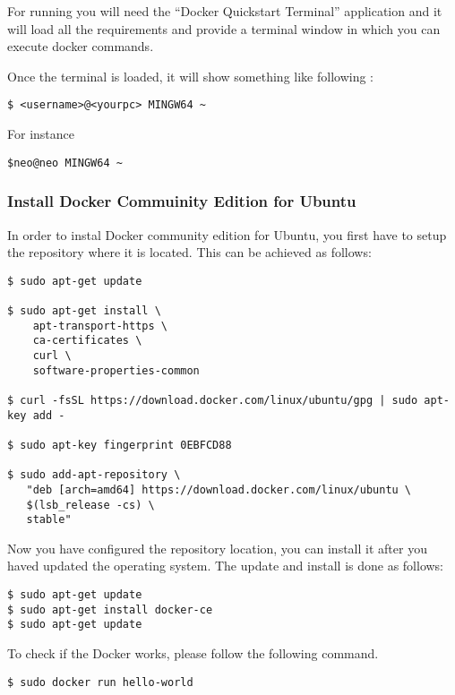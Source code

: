 For running you will need the ``Docker Quickstart Terminal'' application
and it will load all the requirements and provide a terminal window in
which you can execute docker commands.

Once the terminal is loaded, it will show something like following :

\begin{verbatim}
$ <username>@<yourpc> MINGW64 ~
\end{verbatim}

For instance

\begin{verbatim}
$neo@neo MINGW64 ~
\end{verbatim}

\subsubsection{Install Docker Commuinity Edition for
Ubuntu}\label{install-docker-commuinity-edition-for-ubuntu}

In order to instal Docker community edition for Ubuntu, you first have
to setup the repository where it is located. This can be achieved as
follows:

\begin{verbatim}
$ sudo apt-get update

$ sudo apt-get install \
    apt-transport-https \
    ca-certificates \
    curl \
    software-properties-common

$ curl -fsSL https://download.docker.com/linux/ubuntu/gpg | sudo apt-key add -

$ sudo apt-key fingerprint 0EBFCD88

$ sudo add-apt-repository \
   "deb [arch=amd64] https://download.docker.com/linux/ubuntu \
   $(lsb_release -cs) \
   stable"
\end{verbatim}

Now you have configured the repository location, you can install it
after you haved updated the operating system. The update and install is
done as follows:

\begin{verbatim}
$ sudo apt-get update
$ sudo apt-get install docker-ce
$ sudo apt-get update
\end{verbatim}

To check if the Docker works, please follow the following command.

\begin{verbatim}
$ sudo docker run hello-world
\end{verbatim}

